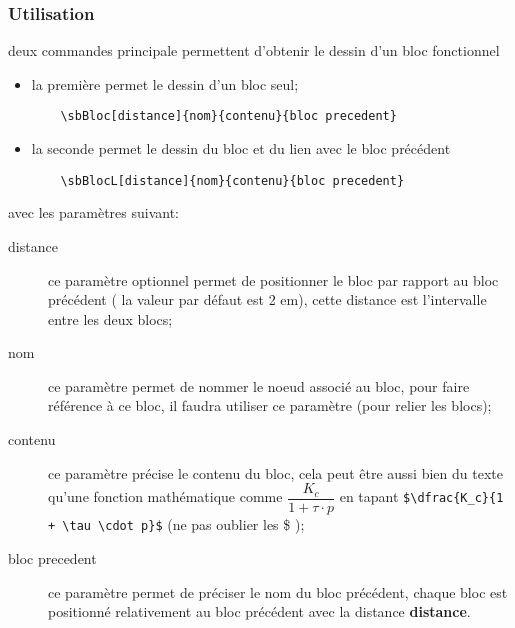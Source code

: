 \documentclass[a4paper,11pt]{article}                      %
\begin{document}
\subsubsection {Utilisation}
deux commandes principale permettent d'obtenir le dessin d'un bloc fonctionnel
\begin{itemize}
\item la première permet le dessin d'un bloc seul;
\begin{verbatim}
    \sbBloc[distance]{nom}{contenu}{bloc precedent}
\end{verbatim}
\item la seconde permet le dessin du bloc et du lien avec le bloc précédent
\begin{verbatim}
    \sbBlocL[distance]{nom}{contenu}{bloc precedent}
\end{verbatim}
\end{itemize}

 avec les paramètres suivant:

\begin{description}
\item [distance] ce paramètre optionnel permet de positionner le bloc par rapport au bloc précédent ( la valeur par défaut est 2 em), cette distance est l'intervalle entre les deux blocs;
\item [nom] ce paramètre  permet de nommer le noeud associé au bloc, pour faire référence à ce bloc, il faudra utiliser ce paramètre (pour relier les blocs);
\item [contenu] ce paramètre précise le contenu du bloc, cela peut être aussi bien du texte qu'une fonction mathématique comme $\dfrac{K_c}{1 + \tau \cdot p}$ en tapant \verb"$\dfrac{K_c}{1 + \tau \cdot p}$" (ne pas oublier les \$ );
\item[bloc precedent] ce paramètre permet de préciser le nom du bloc précédent, chaque bloc est positionné relativement au bloc précédent avec la distance \textbf{distance}.
\end{description}
\end{document}
